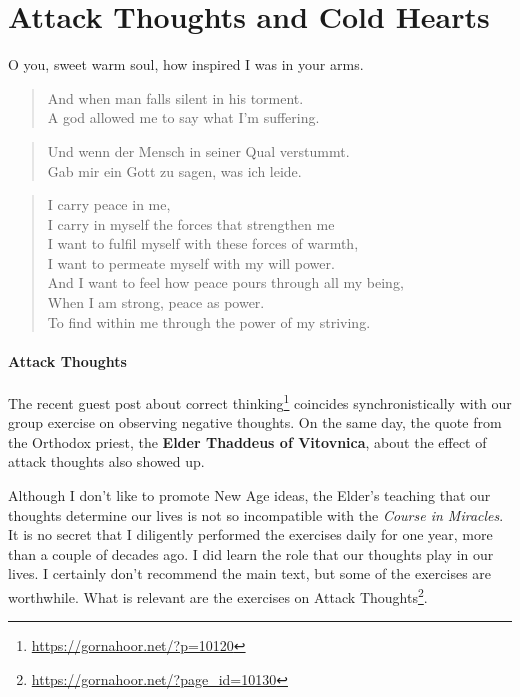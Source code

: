\section{Attack Thoughts and Cold Hearts}

\begin{quotex}
O you, sweet warm soul, how inspired I was in your arms.

\begin{verse}
And when man falls silent in his torment.\\
A god allowed me to say what I'm suffering.
\end{verse}

\begin{verse}
Und wenn der Mensch in seiner Qual verstummt.\\
Gab mir ein Gott zu sagen, was ich leide.
\end{verse}

\begin{verse}
I carry peace in me,\\
I carry in myself the forces that strengthen me\\
I want to fulfil myself with these forces of warmth,\\
I want to permeate myself with my will power.\\
And I want to feel how peace pours through all my being,\\
When I am strong, peace as power.\\
To find within me through the power of my striving.
\end{verse}
\end{quotex}


\paragraph{Attack Thoughts}

The recent guest post about correct thinking\footnote{\url{https://gornahoor.net/?p=10120}} coincides synchronistically with our group exercise on observing negative thoughts. On the same day, the quote from the Orthodox priest, the \textbf{Elder Thaddeus of Vitovnica}, about the effect of attack thoughts also showed up.

Although I don't like to promote New Age ideas, the Elder's teaching that our thoughts determine our lives is not so incompatible with the \emph{Course in Miracles}. It is no secret that I diligently performed the exercises daily for one year, more than a couple of decades ago. I did learn the role that our thoughts play in our lives. I certainly don't recommend the main text, but some of the exercises are worthwhile. What is relevant are the exercises on Attack Thoughts\footnote{\url{https://gornahoor.net/?page_id=10130}}.


